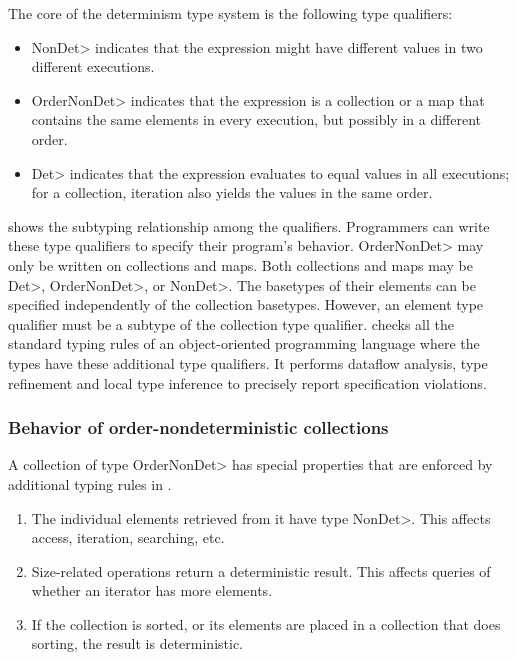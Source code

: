 The core of the determinism type system is the following type qualifiers:
\begin{itemize}
    \item \<NonDet> indicates
    that the expression might have different values in two different executions.
    \item \<OrderNonDet> indicates that the expression is a collection or
    a map that contains the same elements in every execution, but possibly
    in a different order.
    \item \<Det> indicates that the expression evaluates to equal values in
    all executions; for a collection, iteration
    also yields the values in the same order.
\end{itemize}
 shows the subtyping
relationship among the qualifiers.
Programmers can write these type qualifiers to specify their program's behavior.
\<OrderNonDet> may only be written on collections and maps.
Both collections and maps may be \<Det>, \<OrderNonDet>, or \<NonDet>.
The basetypes of their elements can be specified independently of the collection basetypes.
However, an element type qualifier must be a subtype of the collection type qualifier.
\OurTypeSystem checks all the standard typing rules of an object-oriented programming language where the types have these additional type qualifiers. It performs dataflow analysis,
type refinement and local type inference to precisely report specification violations.

\subsubsection{Behavior of order-nondeterministic collections}\label{sec:ond-behavior}
A collection of type \<OrderNonDet> has special properties that are enforced by additional typing rules in \ourTypeSystem.

\begin{enumerate}
    \item
    The individual elements retrieved from it have type \<NonDet>.  This
    affects access, iteration, searching, etc.
    \item
    Size-related operations return a deterministic result.  This affects
    queries of whether an iterator has more elements.
    \item
    If the collection is sorted, or its elements are placed in a collection
    that does sorting, the result is deterministic.
\end{enumerate}
